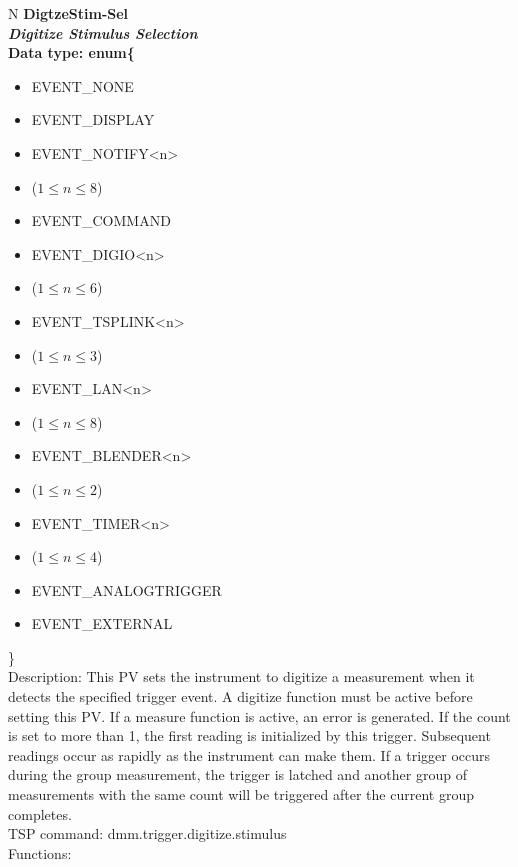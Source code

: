 \documentclass[openany]{article}
\begin{document}
		\begin{tabular}{N}
			\hline
			\bfseries DigtzeStim-Sel\label{pv:digtzestim-sel} \\ \hline
			\emph{Digitize Stimulus Selection} \\
			Data type: enum\{\begin{itemize}[noitemsep]
				\small
				\item[] EVENT\_NONE
				\item[] EVENT\_DISPLAY
				\item[] EVENT\_NOTIFY\textless n\textgreater
				\item[] ($1\leq n\leq 8$)
				\item[] EVENT\_COMMAND
				\item[] EVENT\_DIGIO\textless n\textgreater
				\item[] ($1\leq n\leq 6$)
				\item[] EVENT\_TSPLINK\textless n\textgreater
				\item[] ($1\leq n\leq 3$)
				\item[] EVENT\_LAN\textless n\textgreater
				\item[] ($1\leq n\leq 8$)
				\item[] EVENT\_BLENDER\textless n\textgreater 
				\item[] ($1\leq n\leq 2$)
				\item[] EVENT\_TIMER\textless n\textgreater
				\item[] ($1\leq n\leq 4$)
				\item[] EVENT\_ANALOGTRIGGER
				\item[] EVENT\_EXTERNAL
			\end{itemize}\} \\
			Description: This PV sets the instrument to digitize a measurement when it detects the specified trigger event. A digitize function must be active before setting this PV. If a measure function is active, an error is generated. If the count is set to more than 1, the first reading is initialized by this trigger. Subsequent readings occur as rapidly as the instrument can make them. If a trigger occurs during the group measurement, the trigger is latched and another group of measurements with the same count will be triggered after the current group completes. \\
			TSP command: dmm.trigger.digitize.stimulus \\
			Functions: \\
			\arrayrulecolor{\FuncTableBorderColor}

		\end{tabular}
\end{document}
